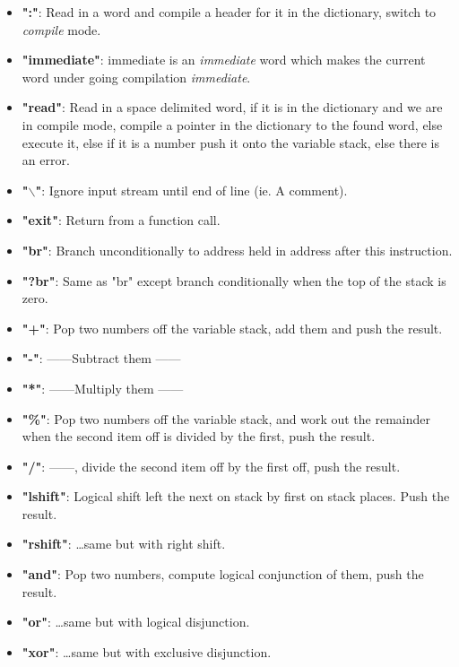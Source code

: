\documentclass	[a4paper, 10pt]	{article}
\newcommand*{\ditto}{---\textquotedbl---}
\begin{document}
      \begin{itemize}
        \item \textbf{":"}: Read in a word and compile a header for it in the
        dictionary, switch to \emph{compile} mode.
        \item \textbf{"immediate"}: immediate is an \emph{immediate} word which
        makes the current word under going compilation \emph{immediate}.
        \item \textbf{"read"}: Read in a space delimited word, if it is in the
        dictionary and we are in compile mode, compile a pointer in the dictionary
        to the found word, else execute it, else if it is a number push it onto
        the variable stack, else there is an error.
        \item \textbf{"$\backslash$"}: Ignore input stream until end of line 
        (ie. A comment).
        \item \textbf{"exit"}: Return from a function call.
        \item \textbf{"br"}: Branch unconditionally to address held in address
        after this instruction.
        \item \textbf{"?br"}: Same as "br" except branch conditionally when
        the top of the stack is zero.
        \item \textbf{"+"}: Pop two numbers off the variable stack, add them
        and push the result.
        \item \textbf{"-"}: \ditto Subtract them \ditto 
        \item \textbf{"*"}: \ditto Multiply them \ditto
        \item \textbf{"\%"}: Pop two numbers off the variable stack, 
        and work out the remainder when the second item off is divided by
        the first, push the result.
        \item \textbf{"/"}: \ditto, divide the second item off by the first
        off, push the result.
        \item \textbf{"lshift"}: Logical shift left the next on stack by
        first on stack places. Push the result.
        \item \textbf{"rshift"}: \ldots same but with right shift.
        \item \textbf{"and"}: Pop two numbers, compute logical conjunction of them,
        push the result.
        \item \textbf{"or"}: \ldots same but with logical disjunction.
        \item \textbf{"xor"}: \ldots same but with exclusive disjunction.

\end{itemize}
\end{document}
